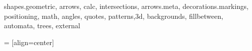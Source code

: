\usepackage{xcolor}
\usepackage{graphicx}
\usepackage{ifthen}
\usepackage{xifthen}
\usepackage{amssymb,amsmath,amsthm}
\usepackage{pgf,pgfplots,pgfkeys}
\usepackage{tikz}
\usepackage{tkz-euclide}
\usepackage{siunitx} %
\usepackage{caption}



%

\usetikzlibrary
    {
      shapes.geometric,
      arrows,
      calc,
      intersections,
      arrows.meta,
      decorations.markings,
      positioning,
      math,
      angles,
      quotes,
      patterns,3d,
      backgrounds,
      fillbetween,
      automata,
      trees,
      external
    }


\makeatletter
\newcommand{\gettikzxy}[3]{%
  \tikz@scan@one@point\pgfutil@firstofone#1\relax
  \edef#2{\the\pgf@x}%
  \edef#3{\the\pgf@y}%
  \tikzmath{#2=#2/28.3465;};
  \tikzmath{#3=#3/28.3465;};
}
 = [align=center]
\makeatother


\pgfplotsset{compat=1.18}



\newcommand\DrawControl[3]{
  node[#2,circle,fill=#2,inner sep=2pt,label={above:$#1$},label={[black]below:{\footnotesize#3}}] at #1 {}
 }

